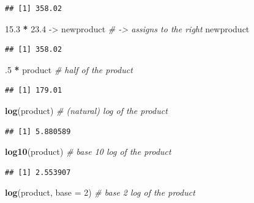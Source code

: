 \documentclass[]{book}
\newenvironment{Shaded}{\begin{snugshade}}{\end{snugshade}}
\newcommand{\CommentTok}[1]{\textcolor[rgb]{0.56,0.35,0.01}{\textit{#1}}}
\newcommand{\DataTypeTok}[1]{\textcolor[rgb]{0.13,0.29,0.53}{#1}}
\newcommand{\DecValTok}[1]{\textcolor[rgb]{0.00,0.00,0.81}{#1}}
\newcommand{\FloatTok}[1]{\textcolor[rgb]{0.00,0.00,0.81}{#1}}
\newcommand{\KeywordTok}[1]{\textcolor[rgb]{0.13,0.29,0.53}{\textbf{#1}}}
\newcommand{\NormalTok}[1]{#1}
\newcommand{\OperatorTok}[1]{\textcolor[rgb]{0.81,0.36,0.00}{\textbf{#1}}}
\newcommand{\StringTok}[1]{\textcolor[rgb]{0.31,0.60,0.02}{#1}}
\begin{document}
\begin{verbatim}
## [1] 358.02
\end{verbatim}

\begin{Shaded}
\begin{Highlighting}[]
\FloatTok{15.3} \OperatorTok{*}\StringTok{ }\FloatTok{23.4}\NormalTok{ ->}\StringTok{ }\NormalTok{newproduct   }\CommentTok{# -> assigns to the right}
\NormalTok{newproduct}
\end{Highlighting}
\end{Shaded}

\begin{verbatim}
## [1] 358.02
\end{verbatim}

\begin{Shaded}
\begin{Highlighting}[]
\FloatTok{.5} \OperatorTok{*}\StringTok{ }\NormalTok{product                }\CommentTok{# half of the product}
\end{Highlighting}
\end{Shaded}

\begin{verbatim}
## [1] 179.01
\end{verbatim}

\begin{Shaded}
\begin{Highlighting}[]
\KeywordTok{log}\NormalTok{(product)                }\CommentTok{# (natural) log of the product}
\end{Highlighting}
\end{Shaded}

\begin{verbatim}
## [1] 5.880589
\end{verbatim}

\begin{Shaded}
\begin{Highlighting}[]
\KeywordTok{log10}\NormalTok{(product)              }\CommentTok{# base 10 log of the product}
\end{Highlighting}
\end{Shaded}

\begin{verbatim}
## [1] 2.553907
\end{verbatim}

\begin{Shaded}
\begin{Highlighting}[]
\KeywordTok{log}\NormalTok{(product, }\DataTypeTok{base =} \DecValTok{2}\NormalTok{)      }\CommentTok{# base 2 log of the product}
\end{Highlighting}
\end{Shaded}
\end{document}
